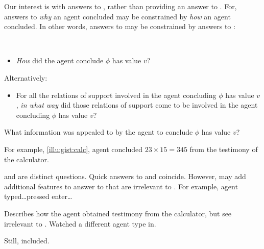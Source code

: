 \begin{note}
  Our interest is with answers to \qWhy{}, rather than providing an answer to \qWhy{}.
  For, answers to \emph{why} an agent concluded may be constrained by \emph{how} an agent concluded.
  In other words, answers to \qWhy{} may be constrained by answers to \qHow{}:

  \begin{question}[\qHow{}?]
    \label{q:how}
    \mbox{ }
    \vspace{-\baselineskip}
    \begin{itemize}
    \item
      \emph{How} did the agent conclude \(\phi\) has value \(v\)?
    \end{itemize}

    Alternatively:

    \begin{itemize}
    \item
      For all the relations of support involved in the agent concluding \(\phi\) has value \(v\), \emph{in what way} did those relations of support come to be involved in the agent concluding \(\phi\) has value \(v\)?
    \end{itemize}
    \vspace{-\baselineskip}
    \vspace{-\baselineskip}
  \end{question}

  What information was appealed to by the agent to conclude \(\phi\) has value \(v\)?

  For example, \autoref{illu:gist:calc}, agent concluded \(23 \times 15 = 345\) from the testimony of the calculator.
\end{note}

\begin{note}
  \qWhy{} and \qHow{} are distinct questions.
  Quick answers to \qWhy{} and \qHow{} coincide.
  However, may add additional features to answer to \qHow{} that are irrelevant to \qWhy{}.
  For example, agent typed\dots pressed enter\dots

  Describes how the agent obtained testimony from the calculator, but see irrelevant to \qWhy{}.
  Watched a different agent type in.

  Still, included.
\end{note}

